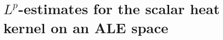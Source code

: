 \documentclass[12pt]{amsart}
\renewcommand{\1}{{\mathbf 1}}
\theoremstyle{others}
\numberwithin{equation}{section}
\begin{document}

\vspace{10mm}




\section{$L^p$-estimates for the scalar heat kernel on an ALE space}\label{sec:proofofLp}
\end{document}
